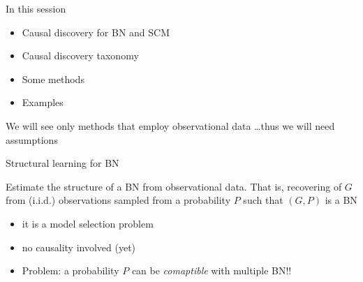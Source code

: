 \documentclass{beamer}
\begin{document}
\begin{frame}{In this session}
	\begin{itemize}
		\item Causal discovery for BN and SCM
		\item Causal discovery taxonomy 
		\item Some methods 
		\item Examples
	\end{itemize}

	\begin{block}{}
We will see only methods that employ observational data \ldots thus we will need assumptions   
		\end{block}
\end{frame}


\begin{frame}{Structural learning for BN} 
	\begin{block}{}
		Estimate the structure of a BN from observational data. That is,
		recovering of $G$ from 
		(i.i.d.) observations sampled from a probability $P$ such that $(G, P)$ is a BN
	\end{block}
	\begin{itemize}
		\item it is a model selection problem
		\item no causality involved (yet) 
		\item Problem: a probability $P$ can be \emph{comaptible} with multiple BN!! 
	\end{itemize}
\end{frame}
\end{document}
